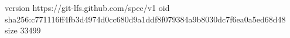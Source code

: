 version https://git-lfs.github.com/spec/v1
oid sha256:c771116ff4fb3d4974d0cc680d9a1ddf8f079384a9b8030dc7f6ea0a5ed68d48
size 33499

